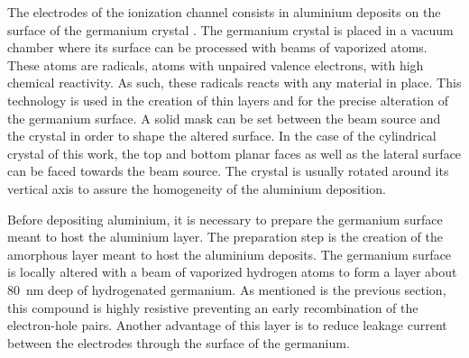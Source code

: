 The electrodes of the ionization channel consists in aluminium deposits on the surface of the germanium crystal \cite{HDRStefanos}. The germanium crystal is placed in a vacuum chamber where its surface can be processed with beams of vaporized atoms. These atoms are radicals, atoms with unpaired valence electrons, with high chemical reactivity. As such, these radicals reacts with any material in place. This technology is used in the creation of thin layers and for the precise alteration of the germanium surface. A solid mask can be set between the beam source and the crystal in order to shape the altered surface. In the case of the cylindrical crystal of this work, the top and bottom planar faces as well as the lateral surface can be faced towards the beam source. The crystal is usually rotated around its vertical axis to assure the homogeneity of the aluminium deposition. 

Before depositing aluminium, it is necessary to prepare the germanium surface meant to host the aluminium layer. The preparation step is the creation of the amorphous layer meant to host the aluminium deposits. The germanium surface is locally altered with a beam of vaporized hydrogen atoms to form a layer about \SI{80}{\nm} deep of hydrogenated germanium. As mentioned is the previous section, this compound is highly resistive preventing an early recombination of the electron-hole pairs. Another advantage of this layer is to reduce leakage current between the electrodes through the surface of the germanium.

